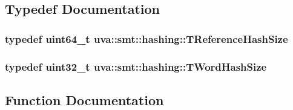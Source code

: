 \subsection{Typedef Documentation}
\hypertarget{namespaceuva_1_1smt_1_1hashing_a6cc10b288b11b76c718a898b022fbdd1}{}
\subsubsection[{T\+Reference\+Hash\+Size}]{\setlength{\rightskip}{0pt plus 5cm}typedef uint64\+\_\+t {\bf uva\+::smt\+::hashing\+::\+T\+Reference\+Hash\+Size}}\label{namespaceuva_1_1smt_1_1hashing_a6cc10b288b11b76c718a898b022fbdd1}
\hypertarget{namespaceuva_1_1smt_1_1hashing_acdc1f2765e669283f8e9c1ed42705314}{}
\subsubsection[{T\+Word\+Hash\+Size}]{\setlength{\rightskip}{0pt plus 5cm}typedef uint32\+\_\+t {\bf uva\+::smt\+::hashing\+::\+T\+Word\+Hash\+Size}}\label{namespaceuva_1_1smt_1_1hashing_acdc1f2765e669283f8e9c1ed42705314}


\subsection{Function Documentation}
\hypertarget{namespaceuva_1_1smt_1_1hashing_ad2b30c50e6db131c94fb813153100c9c}{}
